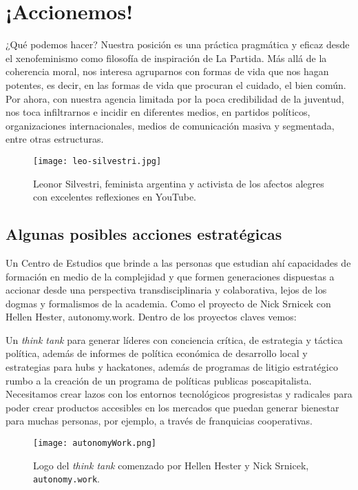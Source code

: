 \chapter{¡Accionemos!}
\label{cha:accionemos}

¿Qué podemos hacer? Nuestra posición es una práctica pragmática y eficaz desde el xenofeminismo como filosofía de inspiración de La Partida. Más allá de la coherencia moral, nos interesa agruparnos con formas de vida que nos hagan potentes, es decir, en las formas de vida que procuran el cuidado, el bien común. Por ahora, con nuestra agencia limitada por la poca credibilidad de la juventud, nos toca infiltrarnos e incidir en diferentes medios, en partidos políticos, organizaciones internacionales, medios de comunicación masiva y segmentada, entre otras estructuras.

\begin{figure}[htbp]
	\centering	\texttt{[image: leo-silvestri.jpg]}
	\caption[Leonor Silvestri]{Leonor Silvestri, feminista argentina y activista de los afectos alegres con excelentes reflexiones en YouTube.}
	\label{fig:silvestri}
\end{figure}

\section{Algunas posibles acciones estratégicas}
\label{sec:posiblesacciones}

Un Centro de Estudios que brinde a las personas que estudian ahí capacidades de formación en medio de la complejidad y que formen generaciones dispuestas a accionar desde una perspectiva transdisciplinaria y colaborativa, lejos de los dogmas y formalismos de la academia. Como el proyecto de Nick Srnicek con Hellen Hester, autonomy.work. Dentro de los proyectos claves vemos:

Un \emph{think tank} para generar líderes con conciencia crítica, de estrategia y táctica política, además de informes de política económica de desarrollo local y estrategias para hubs y hackatones, además de programas de litigio estratégico rumbo a la creación de un programa de políticas publicas poscapitalista. Necesitamos crear lazos con los entornos tecnológicos progresistas y radicales para poder crear productos accesibles en los mercados que puedan generar bienestar para muchas personas, por ejemplo, a través de franquicias cooperativas.

\begin{figure}[htbp]
	\centering	\texttt{[image: autonomyWork.png]}
	\caption{Logo del \emph{think tank} comenzado por Hellen Hester y Nick Srnicek, \texttt{autonomy.work}.}
	\label{fig:autonomywork}
\end{figure}

